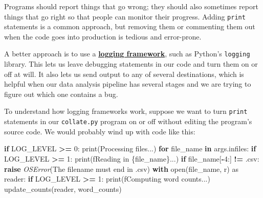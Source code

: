 \documentclass[
]{krantz}
\makeatletter
\newenvironment{Shaded}{\begin{snugshade}}{\end{snugshade}}
\newcommand{\BuiltInTok}[1]{#1}
\newcommand{\ControlFlowTok}[1]{\textcolor[rgb]{0.13,0.29,0.53}{\textbf{#1}}}
\newcommand{\DecValTok}[1]{\textcolor[rgb]{0.00,0.00,0.81}{#1}}
\newcommand{\ImportTok}[1]{#1}
\newcommand{\KeywordTok}[1]{\textcolor[rgb]{0.13,0.29,0.53}{\textbf{#1}}}
\newcommand{\NormalTok}[1]{#1}
\newcommand{\OperatorTok}[1]{\textcolor[rgb]{0.81,0.36,0.00}{\textbf{#1}}}
\newcommand{\PreprocessorTok}[1]{\textcolor[rgb]{0.56,0.35,0.01}{\textit{#1}}}
\newcommand{\SpecialCharTok}[1]{\textcolor[rgb]{0.00,0.00,0.00}{#1}}
\newcommand{\SpecialStringTok}[1]{\textcolor[rgb]{0.31,0.60,0.02}{#1}}
\newcommand{\StringTok}[1]{\textcolor[rgb]{0.31,0.60,0.02}{#1}}
\newenvironment{kframe}{%
\medskip{}
\setlength{\fboxsep}{.8em}
 \def\at@end@of@kframe{}%
 \ifinner\ifhmode%
  \def\at@end@of@kframe{\end{minipage}}%
  \begin{minipage}{\columnwidth}%
 \fi\fi%
 \def\FrameCommand##1{\hskip\@totalleftmargin \hskip-\fboxsep
 \colorbox{shadecolor}{##1}\hskip-\fboxsep
     \hskip-\linewidth \hskip-\@totalleftmargin \hskip\columnwidth}%
 \MakeFramed {\advance\hsize-\width
   \@totalleftmargin\z@ \linewidth\hsize
   \@setminipage}}%
 {\par\unskip\endMakeFramed%
 \at@end@of@kframe}
\renewenvironment{Shaded}{\begin{kframe}}{\end{kframe}}
\newcommand{\gref}[2]{\hyperlink{#2}{\textbf{#1}}}
\makeatother
\begin{document}
Programs should report things that go wrong;
they should also sometimes report things that go right
so that people can monitor their progress.
Adding \texttt{print} statements is a common approach,
but removing them or commenting them out when the code goes into production is tedious and error-prone.

A better approach is to use a \gref{logging framework}{logging\_framework},
such as Python's \texttt{logging} library.
This lets us leave debugging statements in our code
and turn them on or off at will.
It also lets us send output to any of several destinations,
which is helpful when our data analysis pipeline has several stages
and we are trying to figure out which one contains a bug.

To understand how logging frameworks work,
suppose we want to turn \texttt{print} statements in our \texttt{collate.py} program on or off
without editing the program's source code.
We would probably wind up with code like this:

\begin{Shaded}
\begin{Highlighting}[]
\ControlFlowTok{if}\NormalTok{ LOG\_LEVEL }\OperatorTok{\textgreater{}=} \DecValTok{0}\NormalTok{:}
    \BuiltInTok{print}\NormalTok{(}\StringTok{\textquotesingle{}Processing files...\textquotesingle{}}\NormalTok{)}
\ControlFlowTok{for}\NormalTok{ file\_name }\KeywordTok{in}\NormalTok{ args.infiles:}
    \ControlFlowTok{if}\NormalTok{ LOG\_LEVEL }\OperatorTok{\textgreater{}=} \DecValTok{1}\NormalTok{:}
        \BuiltInTok{print}\NormalTok{(}\SpecialStringTok{f\textquotesingle{}Reading in }\SpecialCharTok{\{}\NormalTok{file\_name}\SpecialCharTok{\}}\SpecialStringTok{...\textquotesingle{}}\NormalTok{)}
    \ControlFlowTok{if}\NormalTok{ file\_name[}\OperatorTok{{-}}\DecValTok{4}\NormalTok{:] }\OperatorTok{!=} \StringTok{\textquotesingle{}.csv\textquotesingle{}}\NormalTok{:}
        \ControlFlowTok{raise} \PreprocessorTok{OSError}\NormalTok{(}\StringTok{\textquotesingle{}The filename must end in \textasciigrave{}.csv\textasciigrave{}\textquotesingle{}}\NormalTok{)}
    \ControlFlowTok{with} \BuiltInTok{open}\NormalTok{(file\_name, }\StringTok{\textquotesingle{}r\textquotesingle{}}\NormalTok{) }\ImportTok{as}\NormalTok{ reader:}
        \ControlFlowTok{if}\NormalTok{ LOG\_LEVEL }\OperatorTok{\textgreater{}=} \DecValTok{1}\NormalTok{:}
            \BuiltInTok{print}\NormalTok{(}\SpecialStringTok{f\textquotesingle{}Computing word counts...\textquotesingle{}}\NormalTok{)}
\NormalTok{        update\_counts(reader, word\_counts)}
\end{Highlighting}
\end{Shaded}
\end{document}
